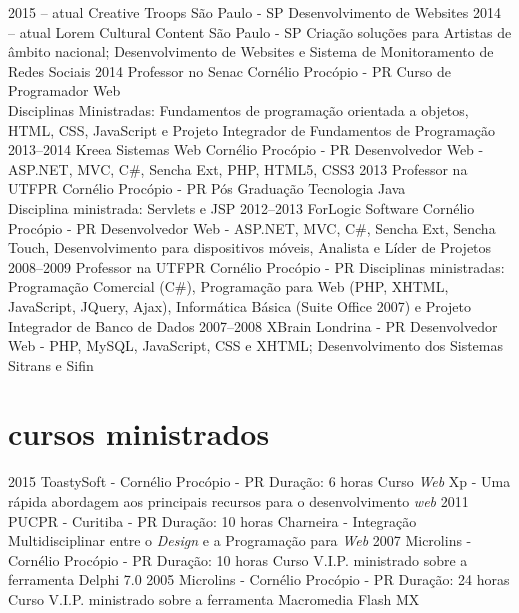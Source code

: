 \documentclass[]{friggeri-cv}
\begin{document}
	\begin{entrylist}
		\entry
		{2015 -- atual}
		{Creative Troops}
		{São Paulo - SP}
		{Desenvolvimento de Websites}
		\entry
		{2014 -- atual}
		{Lorem Cultural Content}
		{São Paulo - SP}
		{Criação soluções para Artistas de âmbito nacional; Desenvolvimento de Websites e Sistema de Monitoramento de Redes Sociais}
		\entry
		{2014}
		{Professor no Senac}
		{Cornélio Procópio - PR}
		{Curso de Programador Web \\ Disciplinas Ministradas: Fundamentos de programação orientada a objetos, HTML, CSS, JavaScript e Projeto Integrador de Fundamentos de Programação}
		\entry
		{2013--2014}
		{Kreea Sistemas Web}
		{Cornélio Procópio - PR}
		{Desenvolvedor Web - ASP.NET, MVC, C\#, Sencha Ext, PHP, HTML5, CSS3}
		\entry
		{2013}
		{Professor na UTFPR}
		{Cornélio Procópio - PR}
		{Pós Graduação Tecnologia Java \\ Disciplina ministrada: Servlets e JSP}
		\entry
		{2012--2013}
		{ForLogic Software}
		{Cornélio Procópio - PR}
		{Desenvolvedor Web - ASP.NET, MVC, C\#, Sencha Ext, Sencha Touch, Desenvolvimento para dispositivos móveis, Analista e Líder de Projetos}
		\entry
		{2008--2009}
		{Professor na UTFPR}
		{Cornélio Procópio - PR}
		{Disciplinas ministradas: Programação Comercial (C\#), Programação para Web (PHP, XHTML, JavaScript, JQuery, Ajax), Informática Básica (Suite Office 2007) e Projeto Integrador de Banco de Dados}
		\entry
		{2007--2008}
		{XBrain}
		{Londrina - PR}
		{Desenvolvedor Web - PHP, MySQL, JavaScript, CSS e XHTML; Desenvolvimento dos Sistemas Sitrans e Sifin}
	\end{entrylist}
	
	\newpage

	\section{cursos ministrados}

	\begin{entrylist}
		\entry
		{2015}
		{ToastySoft - Cornélio Procópio - PR}
		{Duração: 6 horas}
		{Curso \emph{Web} Xp - Uma rápida abordagem aos principais recursos para o desenvolvimento \emph{web}}
		\entry
		{2011}
		{PUCPR - Curitiba - PR}
		{Duração: 10 horas}
		{Charneira - Integração Multidisciplinar entre o \emph{Design} e a Programação para \emph{Web}}
		\entry
		{2007}
		{Microlins - Cornélio Procópio - PR}
		{Duração: 10 horas}
		{Curso V.I.P. ministrado sobre a ferramenta Delphi 7.0}
		\entry
		{2005}
		{Microlins - Cornélio Procópio - PR}
		{Duração: 24 horas}
		{Curso V.I.P. ministrado sobre a ferramenta Macromedia Flash MX}
	\end{entrylist}
\end{document}
